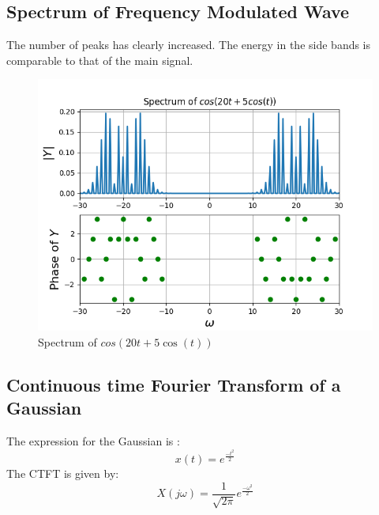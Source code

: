 \documentclass{article}
\begin{document}
\subsection{Spectrum of Frequency Modulated Wave}
The number of peaks has clearly increased. The energy in the side bands is comparable to that of the main signal.
\begin{figure}[h!]
\centering
\includegraphics[scale=0.6]{Figure_7.png}
\caption{Spectrum of $cos(20t +5 \cos(t))$}
\label{fig:universe}
\end{figure}



\subsection{Continuous time Fourier Transform of a Gaussian}

The expression for the Gaussian is :
\begin{equation}
    x(t) = e^{\frac{-t^2}{2}}    
\end{equation}
The CTFT is given by:
\begin{equation}
X(j \omega) = \frac{1}{\sqrt{2 \pi}}e^{\frac{-\omega^2}{2}}    
\end{equation}
\end{document}
